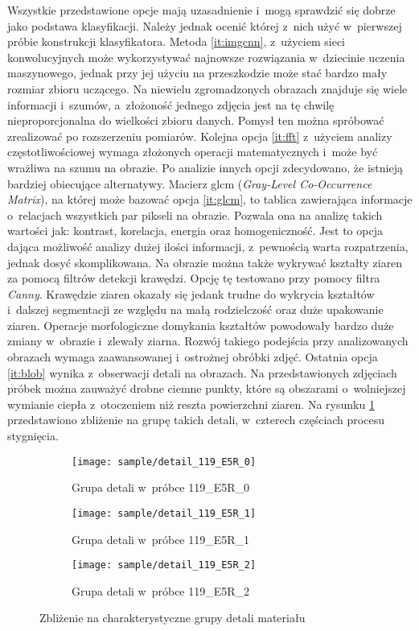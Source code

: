 Wszystkie przedstawione opcje mają uzasadnienie i~mogą sprawdzić się dobrze
jako podstawa klasyfikacji.
Należy jednak ocenić której z~nich użyć w~pierwszej próbie konstrukcji
klasyfikatora. Metoda \ref{it:imgcnn}, z~użyciem sieci konwolucyjnych może
wykorzystywać najnowsze rozwiązania w~dziecinie uczenia maszynowego,
jednak przy jej użyciu na przeszkodzie może stać bardzo mały rozmiar zbioru
uczącego.
Na niewielu zgromadzonych obrazach znajduje się wiele informacji i~szumów,
a~złożoność jednego zdjęcia jest na tę chwilę nieproporcjonalna do wielkości
zbioru danych.
Pomysł ten można spróbować zrealizować po rozszerzeniu pomiarów.
Kolejna opcja \ref{it:fft} z~użyciem analizy częstotliwościowej wymaga
złożonych operacji matematycznych i~może być wrażliwa na szumu na obrazie.
Po analizie innych opcji zdecydowano, że istnieją bardziej obiecujące
alternatywy.
Macierz glcm (\textit{Gray-Level Co-Occurrence Matrix}), na której może
bazować opcja \ref{it:glcm}, to tablica zawierająca informacje o~relacjach
wszystkich par pikseli na obrazie.
Pozwala ona na analizę takich wartości jak: kontrast, korelacja, energia
oraz homogeniczność.
Jest to opcja dająca możliwość analizy dużej ilości informacji, z~pewnością
warta rozpatrzenia, jednak dosyć skomplikowana.
Na obrazie można także wykrywać kształty ziaren za pomocą filtrów detekcji
krawędzi.
Opcję tę testowano przy pomocy filtra \emph{Canny}.
Krawędzie ziaren okazały się jedank trudne do wykrycia kształtów i~dalszej
segmentacji ze względu na małą rodzielczość oraz duże upakowanie ziaren.
Operacje morfologiczne domykania kształtów powodowały bardzo duże zmiany
w~obrazie i~zlewały ziarna.
Rozwój takiego podejścia przy analizowanych obrazach wymaga zaawansowanej
i~ostrożnej obróbki zdjęć.
Ostatnia opcja \ref{it:blob} wynika z~obserwacji detali na obrazach.
Na przedstawionych zdjęciach próbek można zauważyć drobne ciemne punkty,
które są obszarami o~wolniejszej wymianie ciepła z~otoczeniem niż reszta
powierzchni ziaren.
Na rysunku \ref{fig:blobdetail} przedstawiono zbliżenie na grupę takich
detali, w~czterech częściach procesu stygnięcia.
\begin{figure}[htbp]
	\centering
	\begin{subfigure}{0.3\textwidth}
		\centering
		\texttt{[image: sample/detail\_119\_E5R\_0]}
		\caption{Grupa detali w~próbce 119\_E5R\_0}
	\end{subfigure}
	\hspace{0.25cm}
	\centering
	\begin{subfigure}{0.3\textwidth}
		\centering
		\texttt{[image: sample/detail\_119\_E5R\_1]}
		\caption{Grupa detali w~próbce 119\_E5R\_1}
	\end{subfigure}
	\hspace{0.24cm}
	\begin{subfigure}{0.3\textwidth}
		\centering
		\texttt{[image: sample/detail\_119\_E5R\_2]}
		\caption{Grupa detali w~próbce 119\_E5R\_2}
	\end{subfigure}
	\caption{Zbliżenie na charakterystyczne grupy detali materiału}
	\label{fig:blobdetail}
\end{figure}
